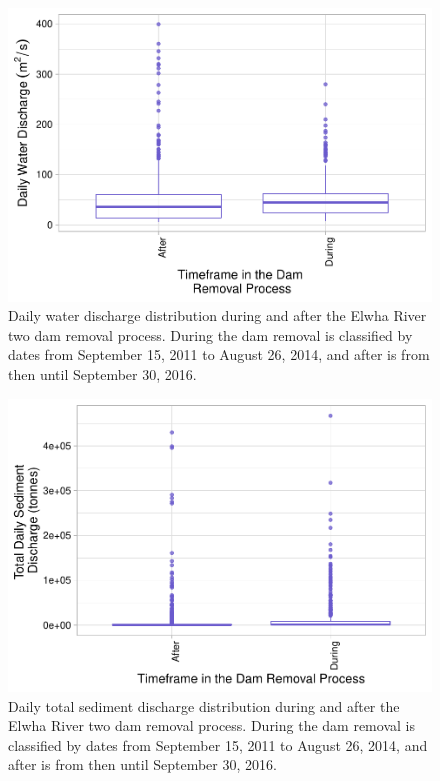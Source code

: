 \documentclass[12pt,]{article}
\begin{document}
\newpage

\begin{figure}
\centering
\includegraphics{Mason_ENV872_ProjectFinal_files/figure-latex/Two Way T-Test REsults Water (Figure 10)-1.pdf}
\caption{Daily water discharge distribution during and after the Elwha
River two dam removal process. During the dam removal is classified by
dates from September 15, 2011 to August 26, 2014, and after is from then
until September 30, 2016.}
\end{figure}

\begin{figure}
\centering
\includegraphics{Mason_ENV872_ProjectFinal_files/figure-latex/Two Way T-Test REsults sediment(Figure 11)-1.pdf}
\caption{Daily total sediment discharge distribution during and after
the Elwha River two dam removal process. During the dam removal is
classified by dates from September 15, 2011 to August 26, 2014, and
after is from then until September 30, 2016.}
\end{figure}
\end{document}
